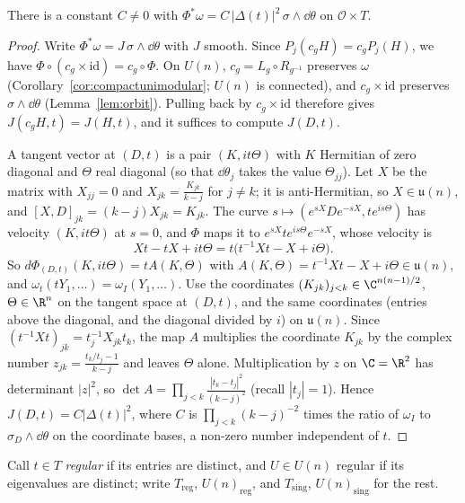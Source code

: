 \begin{lemma}\label{lem:jacobian}
There is a constant $C\neq0$ with $\Phi^*\omega=C\,|\Delta(t)|^2\,\sigma\wedge\dd\theta$ on $\mathcal O\times T$.
\end{lemma}

\begin{proof}
Write $\Phi^*\omega=J\,\sigma\wedge\dd\theta$ with $J$ smooth. Since $P_j(c_gH)=c_gP_j(H)$, we have $\Phi\circ(c_g\times\mathrm{id})=c_g\circ\Phi$. On $U(n)$, $c_g=L_g\circ R_{g^{-1}}$ preserves $\omega$
(Corollary~\ref{cor:compactunimodular}; $U(n)$ is connected), and $c_g\times\mathrm{id}$ preserves $\sigma\wedge\dd\theta$ (Lemma~\ref{lem:orbit}). Pulling back by $c_g\times\mathrm{id}$ therefore gives $J(c_gH,t)=J(H,t)$, and
it suffices to compute $J(D,t)$.

A tangent vector at $(D,t)$ is a pair $(K,it\Theta)$ with $K$ Hermitian of zero diagonal and $\Theta$ real diagonal (so that $\dd\theta_j$ takes the value $\Theta_{jj}$). Let $X$ be the
matrix with $X_{jj}=0$ and $X_{jk}=\frac{K_{jk}}{k-j}$ for $j\neq k$; it is anti-Hermitian, so $X\in\mathfrak u(n)$, and $[X,D]_{jk}=(k-j)X_{jk}=K_{jk}$. The curve $s\mapsto(e^{sX}De^{-sX},te^{is\Theta})$
has velocity $(K,it\Theta)$ at $s=0$, and $\Phi$ maps it to $e^{sX}te^{is\Theta}e^{-sX}$, whose velocity is
\[Xt-tX+it\Theta=t\bigl(t^{-1}Xt-X+i\Theta\bigr).\]
So $d\Phi_{(D,t)}(K,it\Theta)=tA(K,\Theta)$ with $A(K,\Theta)=t^{-1}Xt-X+i\Theta\in\mathfrak u(n)$, and $\omega_t(tY_1,\dots)=\omega_I(Y_1,\dots)$. Use the coordinates $(K_{jk})_{j<k}\in\C^{n(n-1)/2}$, $\Theta\in\R^n$ on the
tangent space at $(D,t)$, and the same coordinates (entries above the diagonal, and the diagonal divided by $i$) on $\mathfrak u(n)$. Since $(t^{-1}Xt)_{jk}=t_j^{-1}X_{jk}t_k$, the map $A$
multiplies the coordinate $K_{jk}$ by the complex number $z_{jk}=\frac{t_k/t_j-1}{k-j}$ and leaves $\Theta$ alone. Multiplication by $z$ on $\C=\R^2$ has determinant $|z|^2$, so
$\det A=\prod_{j<k}\frac{|t_k-t_j|^2}{(k-j)^2}$ (recall $|t_j|=1$). Hence $J(D,t)=C|\Delta(t)|^2$, where $C$ is $\prod_{j<k}(k-j)^{-2}$ times the ratio of $\omega_I$ to $\sigma_D\wedge\dd\theta$ on the coordinate bases,
a non-zero number independent of $t$.
\end{proof}

Call $t\in T$ \emph{regular} if its entries are distinct, and $U\in U(n)$ regular if its eigenvalues are distinct; write $T_{\mathrm{reg}}$, $U(n)_{\mathrm{reg}}$, and $T_{\mathrm{sing}}$, $U(n)_{\mathrm{sing}}$ for the rest.

